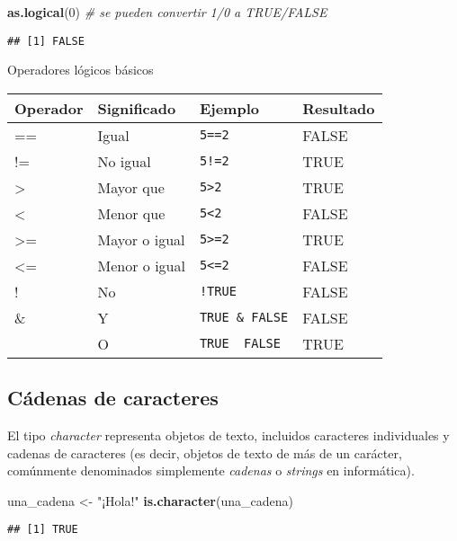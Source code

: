 \documentclass[
]{book}
\newenvironment{Shaded}{\begin{snugshade}}{\end{snugshade}}
\newcommand{\CommentTok}[1]{\textcolor[rgb]{0.56,0.35,0.01}{\textit{#1}}}
\newcommand{\DecValTok}[1]{\textcolor[rgb]{0.00,0.00,0.81}{#1}}
\newcommand{\KeywordTok}[1]{\textcolor[rgb]{0.13,0.29,0.53}{\textbf{#1}}}
\newcommand{\NormalTok}[1]{#1}
\newcommand{\StringTok}[1]{\textcolor[rgb]{0.31,0.60,0.02}{#1}}
\begin{document}
\begin{Shaded}
\begin{Highlighting}[]
\KeywordTok{as.logical}\NormalTok{(}\DecValTok{0}\NormalTok{) }\CommentTok{# se pueden convertir 1/0 a TRUE/FALSE}
\end{Highlighting}
\end{Shaded}

\begin{verbatim}
## [1] FALSE
\end{verbatim}

Operadores lógicos básicos

\begin{longtable}[]{@{}llll@{}}
\toprule
Operador & Significado & Ejemplo & Resultado\tabularnewline
\midrule
\endhead
== & Igual & \texttt{5==2} & FALSE\tabularnewline
!= & No igual & \texttt{5!=2} & TRUE\tabularnewline
\textgreater{} & Mayor que & \texttt{5\textgreater{}2} & TRUE\tabularnewline
\textless{} & Menor que & \texttt{5\textless{}2} & FALSE\tabularnewline
\textgreater= & Mayor o igual & \texttt{5\textgreater{}=2} & TRUE\tabularnewline
\textless= & Menor o igual & \texttt{5\textless{}=2} & FALSE\tabularnewline
! & No & \texttt{!TRUE} & FALSE\tabularnewline
\& & Y & \texttt{TRUE\ \&\ FALSE} & FALSE\tabularnewline
\textbar{} & O & \texttt{TRUE\ \textbar{}\ FALSE} & TRUE\tabularnewline
\bottomrule
\end{longtable}

\hypertarget{cuxe1denas-de-caracteres}{%
\subsection{Cádenas de caracteres}\label{cuxe1denas-de-caracteres}}

El tipo \emph{character} representa objetos de texto, incluidos caracteres individuales y cadenas de caracteres (es decir, objetos de texto de más de un carácter, comúnmente denominados simplemente \emph{cadenas} o \emph{strings} en informática).

\begin{Shaded}
\begin{Highlighting}[]
\NormalTok{una_cadena <-}\StringTok{ "¡Hola!"}
\KeywordTok{is.character}\NormalTok{(una_cadena)}
\end{Highlighting}
\end{Shaded}

\begin{verbatim}
## [1] TRUE
\end{verbatim}
\end{document}
